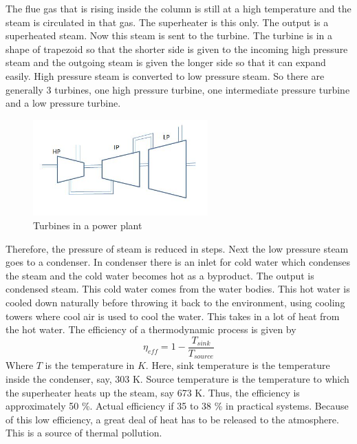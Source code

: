 \documentclass{report}
\begin{document}
\par The flue gas that is rising inside the column is still at a high temperature and the steam is circulated in that gas. The superheater is this only. The output is a superheated steam. Now this steam is sent to the turbine.  The turbine is in a shape of trapezoid so that the shorter side is given to the incoming high pressure steam and the outgoing steam is given the longer side so that it can expand easily. High pressure steam is converted to low pressure steam. So there are generally 3 turbines, one high pressure turbine, one intermediate pressure turbine and a low pressure turbine. 
\\ 
\begin{figure}[H]
\centering \includegraphics[width=0.6\textwidth]{captures/Capture4.JPG}
\caption{Turbines in a power plant}
\end{figure}
\par Therefore, the pressure of steam is reduced in steps. Next the low pressure steam goes to a condenser. In condenser there is an inlet for cold water which condenses the steam and the cold water becomes hot as a byproduct. The output is condensed steam. This cold water comes from the water bodies. This hot water is cooled down naturally before throwing it back to the environment, using cooling towers where cool air is used to cool the water. This takes in a lot of heat from the hot water. 
The efficiency of a thermodynamic process is given by
\begin{equation}
\displaystyle \eta_{eff} = 1 - \frac{T_{sink}}{T_{source}}
\end{equation}
Where $T$ is the temperature in $K$. Here, sink temperature is the temperature inside the condenser, say, 303 K. Source temperature is the temperature to which the superheater heats up the steam, say 673 K. Thus, the efficiency is  approximately 50 \%. Actual efficiency if 35 to 38 \% in practical systems. Because of this low efficiency, a great deal of heat has to be released to the atmosphere. This is a source of thermal pollution. 
\end{document}
